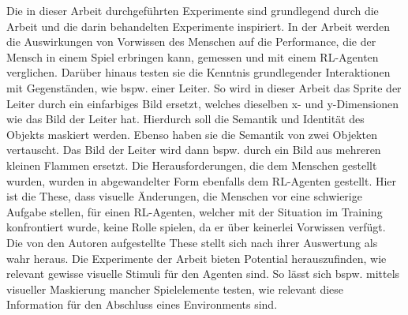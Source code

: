 Die in dieser Arbeit durchgeführten Experimente sind grundlegend durch die Arbeit \cite{dubey2018investigating} und die darin behandelten Experimente inspiriert. In der Arbeit werden die Auswirkungen von Vorwissen des Menschen auf die Performance, die der Mensch in einem Spiel erbringen kann, gemessen und mit einem RL-Agenten verglichen. Darüber hinaus testen sie die Kenntnis grundlegender Interaktionen mit Gegenständen, wie bspw. einer Leiter. So wird in dieser Arbeit das Sprite der Leiter durch ein einfarbiges Bild ersetzt, welches dieselben x- und y-Dimensionen wie das Bild der Leiter hat. Hierdurch soll die Semantik und Identität des Objekts maskiert werden. Ebenso haben sie die Semantik von zwei Objekten vertauscht. Das Bild der Leiter wird dann bspw. durch ein Bild aus mehreren kleinen Flammen ersetzt. Die Herausforderungen, die dem Menschen gestellt wurden, wurden in abgewandelter Form ebenfalls dem RL-Agenten gestellt. Hier ist die These, dass visuelle Änderungen, die Menschen vor eine schwierige Aufgabe stellen, für einen RL-Agenten, welcher mit der Situation im Training konfrontiert wurde, keine Rolle spielen, da er über keinerlei Vorwissen verfügt. Die von den Autoren aufgestellte These stellt sich nach ihrer Auswertung als wahr heraus. Die Experimente der Arbeit \cite{dubey2018investigating} bieten Potential herauszufinden, wie relevant gewisse visuelle Stimuli für den Agenten sind. So lässt sich bspw. mittels visueller Maskierung mancher Spielelemente testen, wie relevant diese Information für den Abschluss eines Environments sind. 






\newpage